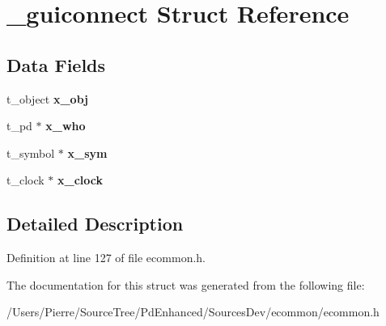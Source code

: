 \hypertarget{struct__guiconnect}{\section{\-\_\-guiconnect Struct Reference}
\label{struct__guiconnect}
}
\subsection*{Data Fields}
\begin{DoxyCompactItemize}
\item 
\hypertarget{struct__guiconnect_aec9b618f42517cd6740f1d37dba87d0a}{t\-\_\-object {\bfseries x\-\_\-obj}}\label{struct__guiconnect_aec9b618f42517cd6740f1d37dba87d0a}

\item 
\hypertarget{struct__guiconnect_abbd575f25ecf1fc4fc706f487f7bf433}{t\-\_\-pd $\ast$ {\bfseries x\-\_\-who}}\label{struct__guiconnect_abbd575f25ecf1fc4fc706f487f7bf433}

\item 
\hypertarget{struct__guiconnect_aac75f326262b21717e7625275550a9cc}{t\-\_\-symbol $\ast$ {\bfseries x\-\_\-sym}}\label{struct__guiconnect_aac75f326262b21717e7625275550a9cc}

\item 
\hypertarget{struct__guiconnect_a959680d1c5640f1e34e835dda3021eef}{t\-\_\-clock $\ast$ {\bfseries x\-\_\-clock}}\label{struct__guiconnect_a959680d1c5640f1e34e835dda3021eef}

\end{DoxyCompactItemize}


\subsection{Detailed Description}


Definition at line 127 of file ecommon.\-h.



The documentation for this struct was generated from the following file\-:\begin{DoxyCompactItemize}
\item 
/\-Users/\-Pierre/\-Source\-Tree/\-Pd\-Enhanced/\-Sources\-Dev/ecommon/ecommon.\-h\end{DoxyCompactItemize}
